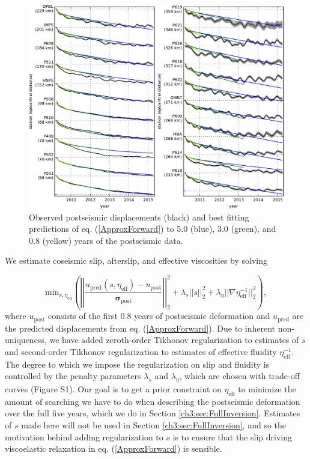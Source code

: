 \begin{figure}\label{ch3:fig:RecordSection1}
\includegraphics[scale=1.0]{ch3/figures/2016jb013114-p10}
\caption{Observed postseismic displacements (black) and best fitting predictions of eq. (\ref{ApproxForward}) to 5.0 (blue), 3.0 (green), and 0.8 (yellow) years of the postseismic data.} 
\end{figure}

We estimate coseismic slip, afterslip, and effective viscosities by solving 

\begin{equation}\label{ObjectiveFunction}
 \mathrm{min}_{s,\eta_\mathrm{eff}} \left(\left|\left|
 \frac{u_\mathrm{pred}(s,\eta_\mathrm{eff}) - u_\mathrm{post}}
 {\mathbf{\sigma_\mathrm{post}}}\right|\right|_2^2 + 
 \lambda_s||s||_2^2 + 
 \lambda_\eta||\nabla \eta_{\mathrm{eff}}^{-1}||_2^2\right),
\end{equation} 
where $u_\mathrm{post}$ consists of the first 0.8 years of postseismic deformation and $u_\mathrm{pred}$ are the predicted displacements from eq. (\ref{ApproxForward}).  Due to inherent non-uniqueness, we have added zeroth-order Tikhonov regularization to estimates of $s$ and second-order Tikhonov regularization to estimates of effective fluidity $\eta_\mathrm{eff}^{-1}$. The degree to which we impose the regularization on slip and fluidity is controlled by the penalty parameters $\lambda_s$ and $\lambda_\eta$, which are chosen with trade-off curves (Figure S1).  Our goal is to get a prior constraint on $\eta_{\mathrm{eff}}$ to minimize the amount of searching we have to do when describing the postseismic deformation over the full five years, which we do in Section \ref{ch3:sec:FullInversion}.  Estimates of $s$ made here will not be used in Section \ref{ch3:sec:FullInversion}, and so the motivation behind adding regularization to $s$ is to ensure that the slip driving viscoelastic relaxation in eq. (\ref{ApproxForward}) is sensible.  

